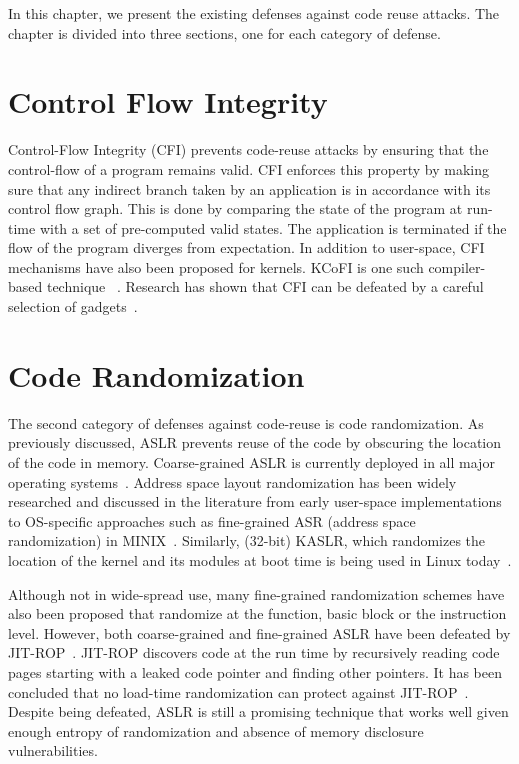 In this chapter, we present the existing defenses against code reuse attacks. The chapter is divided into three sections, one for each category of defense.

\section{Control Flow Integrity}
Control-Flow Integrity (CFI) prevents code-reuse attacks by ensuring that the control-flow of a program remains valid. CFI enforces this property by making sure that any indirect branch taken by an application is in accordance with its control flow graph. This is done by comparing the state of the program at run-time with a set of pre-computed valid states. The application is terminated if the flow of the program diverges from expectation. In addition to user-space, CFI mechanisms have also been proposed for kernels.
KCoFI is one such compiler-based technique ~\cite{Criswell:2014:KCC:2650286.2650804}. Research has shown that CFI can be defeated by a careful selection of gadgets~\cite{evans2015control, davi2014stitching}.

\section{Code Randomization}
The second category of defenses against code-reuse is code randomization. As previously discussed, ASLR prevents reuse of the code by obscuring the location of the code in memory. Coarse-grained ASLR is currently deployed in all major operating systems~\cite{Wartell:2012:BSS:2382196.2382216, ASLR}. Address space layout randomization has been widely researched and discussed in the literature from early user-space implementations~\cite{PAXASLR,MEMORYEXPLOIT} to OS-specific
approaches such as fine-grained ASR (address space randomization) in MINIX~\cite{ASRMINIX}. Similarly, (32-bit) KASLR, which randomizes the location of the kernel and its modules at boot time is being used in Linux today~\cite{KASLRLINUX}.

Although not in wide-spread use, many fine-grained randomization schemes have also been proposed that randomize at the function, basic block or the instruction level. However, both coarse-grained and fine-grained ASLR have been defeated by JIT-ROP~\cite{JITROP}. JIT-ROP discovers code at the run time by recursively reading code pages starting with a leaked code pointer and finding other pointers. It has been concluded that no load-time randomization can protect against JIT-ROP~\cite{JITROP}. Despite being defeated, ASLR is still a promising technique that works well given enough entropy of randomization and absence of memory disclosure vulnerabilities.


